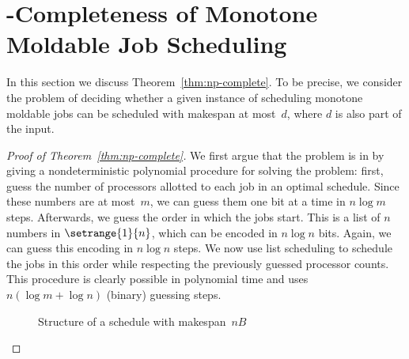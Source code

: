 \section{-Completeness of Monotone Moldable Job Scheduling}
\label{sec:hardness}

In this section we discuss Theorem~\ref{thm:np-complete}.
To be precise, we consider the problem of deciding
whether a given instance of scheduling monotone moldable jobs can be scheduled with makespan at most~$d$,
where $d$ is also part of the input.

\begin{proof}[Proof of Theorem~\ref{thm:np-complete}]
We first argue that the problem is in 
by giving a nondeterministic polynomial procedure for solving the problem:
first, guess the number of processors allotted to each job in an optimal schedule.
Since these numbers are at most~$m$, we can guess them one bit at a time in $n \log m$ steps.
Afterwards, we guess the order in which the jobs start.
This is a list of $n$ numbers in $\setrange{1}{n}$,
which can be encoded in $n \log n$ bits.
Again, we can guess this encoding in $n \log n$ steps.
We now use list scheduling to schedule the jobs in this order
while respecting the previously guessed processor counts.
This procedure is clearly possible in polynomial time and uses $n (\log m + \log n)$ (binary) guessing steps.

\begin{figure}[b]
  \centering
  \caption{Structure of a schedule with makespan~$nB$}
  \label{fig:optimal-schedule}
\end{figure}


\end{proof}
